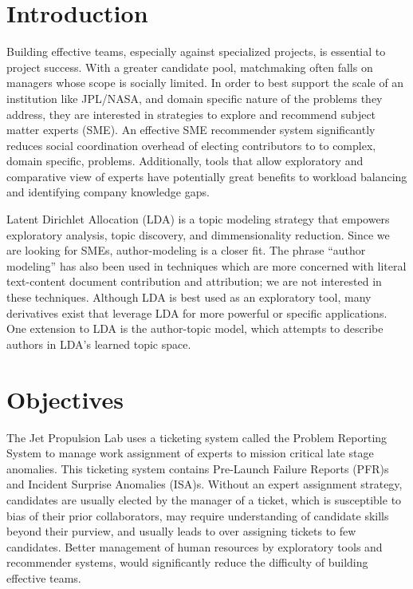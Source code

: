 \documentclass{article}
\begin{document}
\begin{multicols}{2}

\section{Introduction}

Building effective teams, especially against specialized projects, is essential to project
success. With a greater candidate pool, matchmaking often falls on managers whose scope is
socially limited.
In order to best
support the scale of an institution like JPL/NASA, and domain specific
nature of the problems they address, they are
interested in strategies to explore and recommend subject matter experts (SME). An
effective SME recommender system
significantly reduces social coordination overhead of electing contributors to
to complex, domain specific, problems. Additionally, tools that allow exploratory
and comparative view of experts have potentially great benefits to workload
balancing and identifying company knowledge gaps.

Latent Dirichlet Allocation (LDA) is a topic modeling strategy that empowers
exploratory analysis, topic discovery, and dimmensionality reduction.
Since we are looking for SMEs,
author-modeling is a closer fit. The phrase ``author modeling'' has also been used
in techniques which are more concerned with literal text-content document
contribution and attribution\cite{Rexha2018}; we are not interested in these techniques.
Although LDA is best used as an exploratory tool, many derivatives exist that
leverage LDA for more powerful or specific applications.
One extension to LDA is the author-topic model, which attempts to describe authors in
LDA's learned topic space.


\section{Objectives}

The Jet Propulsion Lab uses a ticketing system called the Problem Reporting System
to manage work assignment of experts to mission critical late stage anomalies.
This ticketing system contains Pre-Launch Failure Reports (PFR)s and
Incident Surprise Anomalies (ISA)s. Without an expert assignment strategy,
candidates are usually elected by the manager of a ticket, which is susceptible to bias
of their prior collaborators, may require understanding of candidate skills beyond their
purview, and usually leads to over assigning tickets to few candidates.
Better management of human resources by exploratory tools and recommender systems,
would significantly reduce the difficulty of building
effective teams.


\end{multicols}
\end{document}
